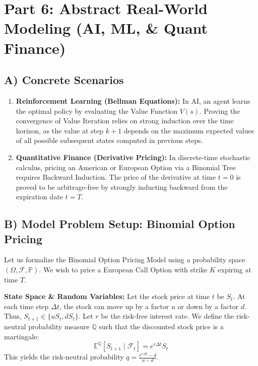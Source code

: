 \documentclass[11pt, a4paper]{article}
\theoremstyle{definition}
\theoremstyle{remark}
\newcommand{\Q}{\mathbb{Q}}
\newcommand{\E}{\mathbb{E}}
\newcommand{\Prob}{\mathbb{P}}
\newcommand{\F}{\mathcal{F}}
\begin{document}
\section{Part 6: Abstract Real-World Modeling (AI, ML, \& Quant Finance)}

\subsection{A) Concrete Scenarios}
\begin{enumerate}
    \item \textbf{Reinforcement Learning (Bellman Equations):} In AI, an agent learns the optimal policy by evaluating the Value Function $V(s)$. Proving the convergence of Value Iteration relies on strong induction over the time horizon, as the value at step $k+1$ depends on the maximum expected values of all possible subsequent states computed in previous steps.
    \item \textbf{Quantitative Finance (Derivative Pricing):} In discrete-time stochastic calculus, pricing an American or European Option via a Binomial Tree requires Backward Induction. The price of the derivative at time $t=0$ is proved to be arbitrage-free by strongly inducting backward from the expiration date $t=T$.
\end{enumerate}

\subsection{B) Model Problem Setup: Binomial Option Pricing}
Let us formalize the Binomial Option Pricing Model using a probability space $(\Omega, \F, \Prob)$. We wish to price a European Call Option with strike $K$ expiring at time $T$.

\textbf{State Space \& Random Variables:}
Let the stock price at time $t$ be $S_t$. At each time step $\Delta t$, the stock can move up by a factor $u$ or down by a factor $d$. Thus, $S_{t+1} \in \{uS_t, dS_t\}$.
Let $r$ be the risk-free interest rate. We define the risk-neutral probability measure $\Q$ such that the discounted stock price is a martingale:
\[ \E^\Q [S_{t+1} \mid \F_t] = e^{r \Delta t} S_t \]
This yields the risk-neutral probability $q = \frac{e^{r \Delta t} - d}{u - d}$.
\end{document}
